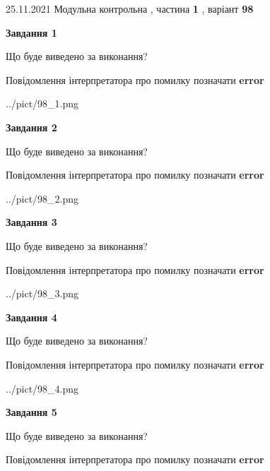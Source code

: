 \documentclass[10pt, ukrainian]{article}
\begin{document}
{25.11.2021 Модульна контрольна , частина \textbf { 1 }, варіант  \No \textbf { 98 }\par}
{
\begin {large}

{\begin {center}\textbf{Завдання 1}\end {center}}\par
Що буде виведено за виконання? \par
Повідомлення інтерпретатора про помилку позначати \textbf{error}

\begin{center}
	{../pict/98_1.png}
\end{center}
\newpage

{\begin {center}\textbf{Завдання 2}\end {center}}\par
Що буде виведено за виконання? \par
Повідомлення інтерпретатора про помилку позначати \textbf{error}

\begin{center}
	{../pict/98_2.png}
\end{center}
\newpage

{\begin {center}\textbf{Завдання 3}\end {center}}\par
Що буде виведено за виконання? \par
Повідомлення інтерпретатора про помилку позначати \textbf{error}

\begin{center}
	{../pict/98_3.png}
\end{center}
\newpage

{\begin {center}\textbf{Завдання 4}\end {center}}\par
Що буде виведено за виконання? \par
Повідомлення інтерпретатора про помилку позначати \textbf{error}

\begin{center}
	{../pict/98_4.png}
\end{center}
\newpage

{\begin {center}\textbf{Завдання 5}\end {center}}\par
Що буде виведено за виконання? \par
Повідомлення інтерпретатора про помилку позначати \textbf{error}


\end{large}}
\end{document}
